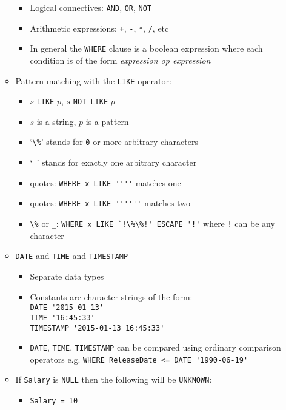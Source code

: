 \documentclass[landscape,8pt]{extarticle}
\newcommand{\code}{\lstinline}
\begin{document}
\begin{multicols}{4}
\begin{itemize}
\begin{itemize}
\begin{itemize}
            \item Logical connectives: \code{AND}, \code{OR}, \code{NOT}
            \item Arithmetic expressions: \code{+}, \code{-}, \code{*}, \code{/}, etc
            \item In general the \code{WHERE} clause is a boolean expression where each condition is
            of the form \emph{expression op expression}
        \end{itemize}
        \item Pattern matching with the \code{LIKE} operator:
        \begin{itemize}
            \item $s$ \code{LIKE} $p$, $s$ \code{NOT LIKE} $p$
            \item $s$ is a string, $p$ is a pattern
            \item `\code{\%}' stands for \code{0} or more arbitrary characters
            \item `\code{_}' stands for exactly one arbitrary character
            \item quotes: \code{WHERE x LIKE ''''} matches one 
            \item quotes: \code{WHERE x LIKE ''''''} matches two 
            \item  \code{\%} or \code{_}: \code{WHERE x LIKE `!\%\%!' ESCAPE '!'} where
            \code{!} can be any character
        \end{itemize}
        \item \code{DATE} and \code{TIME} and \code{TIMESTAMP}
        \begin{itemize}
            \item Separate data types
            \item Constants are character strings of the form: \\
\code{DATE '2015-01-13'} \\
\code{TIME '16:45:33'} \\
\code{TIMESTAMP '2015-01-13 16:45:33'} 
            \item \code{DATE}, \code{TIME}, \code{TIMESTAMP} can be compared using ordinary
            comparison operators e.g. \code{WHERE ReleaseDate <= DATE '1990-06-19'}
\end{itemize}
        \item If \code{Salary} is \code{NULL} then the following will be \code{UNKNOWN}:
        \begin{itemize}
            \item \code{Salary = 10}

\end{itemize}
\end{itemize}
\end{itemize}
\end{multicols}
\end{document}
